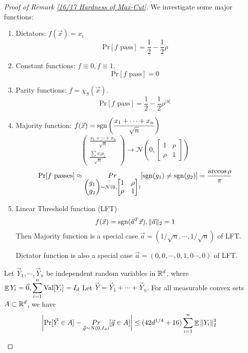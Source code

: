 \begin{proof}[Proof of Remark \ref{16/17 Hardness of Max-Cut}]
    We investigate some major functions:
    \begin{enumerate}
        \item Dictators: $ f(\vec{x})=x_i $
        \[\mathrm{Pr}[f\text{ pass}]=\frac{1}{2}-\frac{1}{2}\rho\]
        \item Constant functions:  $ f\equiv 0,f\equiv 1 $.
        \[ \mathrm{Pr}[f\text{ pass}]=0\]
        \item Parity functions:  $ f=\chi_S(\vec{x}) $.
        \[\mathrm{Pr}[f\text{ pass}]=\frac{1}{2}-\frac{1}{2}\rho^{|S|}\]
        \item Majority function:  $\displaystyle f(\vec{x})=\mathrm{sgn}\left(\frac{x_1+\cdots +x_n}{\sqrt{n}}\right) $ 
        \[\begin{pmatrix}
            \frac{x_1+\cdots +x_n}{\sqrt{n}}\\
            \frac{\sum x_i\mu_i}{\sqrt{n}}
        \end{pmatrix}\rightarrow \mathcal{N}(0,\begin{bmatrix}
            1&\rho\\
            \rho&1
        \end{bmatrix})\]
        \[\mathrm{Pr}[f\text{ passes}]\approx\mathop{Pr}_{\begin{pmatrix}
        g_1\\
        g_2
    \end{pmatrix}\sim \mathcal{N}(0,\begin{bmatrix}
         1&\rho\\
        \rho&1
    \end{bmatrix})}[\mathrm{sgn}(g_1)\neq \mathrm{sgn}(g_2)]=\frac{\arccos\rho}{\pi}\]

    \item Linear Threshold function (LFT)
    \[f(\vec{x})=\mathrm{sgn}(\vec{a}^T\vec{x}),\|\vec{a}\|_2=1\]
    Then Majority function is a special case  $ \vec{a}=(1/\sqrt{n},\cdots,1/\sqrt{n}) $  of LFT.

    Dictator function is also a special case  $ \vec{a}=(0,0,\cdots,0,1,0\cdots,0) $  of LFT.
    \end{enumerate}
    
    \begin{theorem}
        Let  $ \vec{Y}_1,\cdots,\vec{Y}_n $ be independent random variables in  $ \mathbb R^d $, where  $ \mathop\mathbb E Y_i=\vec{0}, \displaystyle\sum_{i=1}^n\mathrm{Val}[Y_i]=I_d $  Let  $ \vec{Y}=\vec{Y}_1+\cdots+\vec{Y}_n $. For all measurable convex sets  $ A\subset \mathbb R^d $, we have 
        \[\left|\mathrm{Pr}[\vec{Y}\in A]-\mathop{Pr}_{\vec{g}\sim N(0,I_d)}[\vec{g}\in A]\right| \leq (42d^{1/4}+16)\sum_{i=1}^n\mathop\mathbb E\|Y_i\|^3_2\]    
    \end{theorem}


\end{proof}
